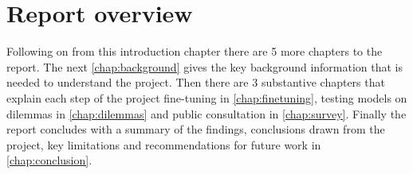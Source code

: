 \section{Report overview}
\label{sec:report_overview}

Following on from this introduction chapter there are 5 more chapters to the report. The next \ref{chap:background} gives the key background information that is needed to understand the project. Then there are 3 substantive chapters that explain each step of the project fine-tuning in \ref{chap:finetuning}, testing models on dilemmas in \ref{chap:dilemmas} and public consultation in \ref{chap:survey}. Finally the report concludes with a summary of the findings, conclusions drawn from the project, key limitations and recommendations for future work in \ref{chap:conclusion}.
